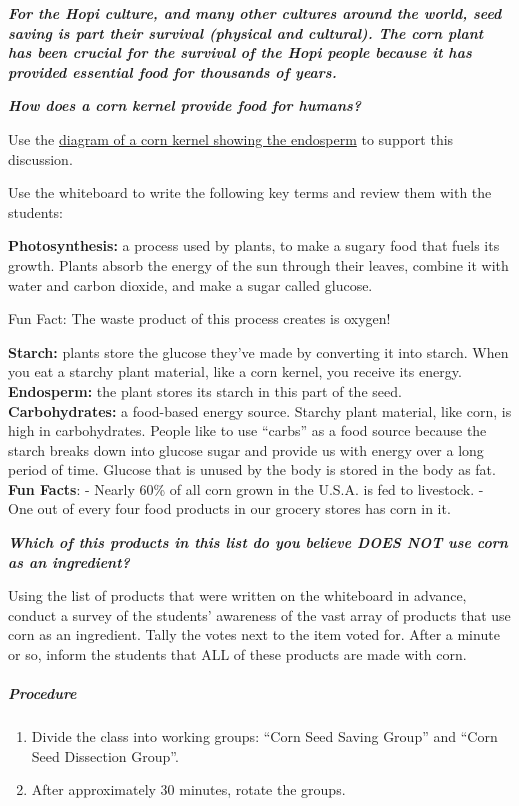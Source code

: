 \documentclass[12pt,]{article}
\providecommand{\tightlist}{%
  \setlength{\itemsep}{0pt}\setlength{\parskip}{0pt}}
\let\oldsubparagraph\subparagraph
\renewcommand{\subparagraph}[1]{\oldsubparagraph{#1}\mbox{}}
\begin{document}
\textbf{\emph{For the Hopi culture, and many other cultures around the world, seed saving is part their survival (physical and cultural). The corn plant has been crucial for the survival of the Hopi people because it has provided essential food for thousands of years.}}

\textbf{\emph{How does a corn kernel provide food for humans? }}

Use the \href{http://media.web.britannica.com/eb-media/54/166754-050-8DEB8E13.jpg}{diagram of a corn kernel showing the endosperm} to support this discussion.

Use the whiteboard to write the following key terms and review them with the students:

\textbf{Photosynthesis:} a process used by plants, to make a sugary food that fuels its growth. Plants absorb the energy of the sun through their leaves, combine it with water and carbon dioxide, and make a sugar called glucose.

Fun Fact: The waste product of this process creates is oxygen!

\textbf{Starch:} plants store the glucose they've made by converting it into starch. When you eat a starchy plant material, like a corn kernel, you receive its energy.
\textbf{Endosperm:} the plant stores its starch in this part of the seed.
\textbf{Carbohydrates:} a food-based energy source. Starchy plant material, like corn, is high in carbohydrates. People like to use ``carbs'' as a food source because the starch breaks down into glucose sugar and provide us with energy over a long period of time. Glucose that is unused by the body is stored in the body as fat.
\textbf{Fun Facts}:
- Nearly 60\% of all corn grown in the U.S.A. is fed to livestock.
- One out of every four food products in our grocery stores has corn in it.

\textbf{\emph{Which of this products in this list do you believe DOES NOT use corn as an ingredient? }}

Using the list of products that were written on the whiteboard in advance, conduct a survey of the students' awareness of the vast array of products that use corn as an ingredient. Tally the votes next to the item voted for. After a minute or so, inform the students that ALL of these products are made with corn.

\hypertarget{procedure-5}{%
\subparagraph{Procedure}\label{procedure-5}}

\begin{enumerate}
\def\labelenumi{\arabic{enumi}.}
\tightlist
\item
  Divide the class into working groups: ``Corn Seed Saving Group'' and ``Corn Seed Dissection Group''.
\item
  After approximately 30 minutes, rotate the groups.
\end{enumerate}
\end{document}
